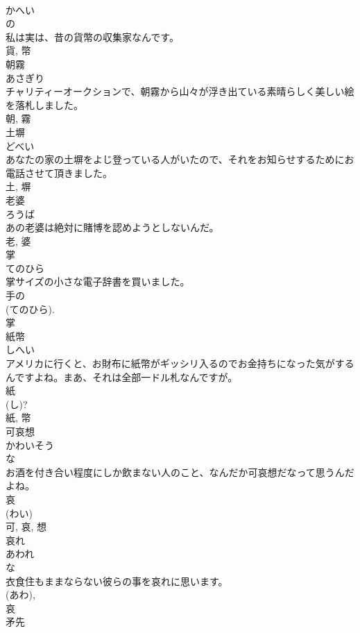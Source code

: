 \documentclass[8pt]{extreport}
\begin{document}
\begin{CJK}{UTF8}{min}
\\	かへい	
\\	の 
\\	私は実は、昔の貨幣の収集家なんです。	
\\	貨, 幣	
\\	朝霧	
\\	あさぎり	
\\	チャリティーオークションで、朝霧から山々が浮き出ている素晴らしく美しい絵を落札しました。	
\\	朝, 霧	
\\	土塀	
\\	どべい	
\\	あなたの家の土塀をよじ登っている人がいたので、それをお知らせするためにお電話させて頂きました。	
\\	土, 塀	
\\	老婆	
\\	ろうば	
\\	あの老婆は絶対に賭博を認めようとしないんだ。	
\\	老, 婆	
\\	掌	
\\	てのひら	
\\	掌サイズの小さな電子辞書を買いました。	
\\	手の
\\	(てのひら). 
\\	掌	
\\	紙幣	
\\	しへい	
\\	アメリカに行くと、お財布に紙幣がギッシリ入るのでお金持ちになった気がするんですよね。まあ、それは全部一ドル札なんですが。	
\\	紙 
\\	(し)? 
\\	紙, 幣	
\\	可哀想	
\\	かわいそう	
\\	な 
\\	お酒を付き合い程度にしか飲まない人のこと、なんだか可哀想だなって思うんだよね。	
\\	哀 
\\	(わい) 
\\	可, 哀, 想	
\\	哀れ	
\\	あわれ	
\\	な 
\\	衣食住もままならない彼らの事を哀れに思います。	
\\	(あわ), 
\\	哀	
\\	矛先	

\end{CJK}
\end{document}
